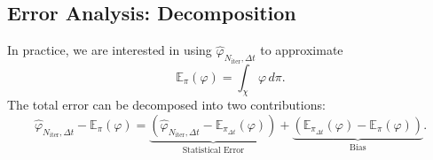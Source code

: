 \documentclass{article}
\newtheorem{theorem}{Theorem}[section]
\begin{document}

\subsection{Error Analysis: Decomposition}

In practice, we are interested in using $\widehat{\varphi}_{N_{\text{iter}},\Delta t}$ to approximate
\[
\mathbb{E}_\pi(\varphi) = \int_\chi \varphi \, d\pi.
\]
The total error can be decomposed into two contributions:
\begin{equation} \label{eq:statistic_bias}
    \widehat{\varphi}_{N_{\text{iter}},\Delta t} - \mathbb{E}_\pi(\varphi) = \underbrace{\left( \widehat{\varphi}_{N_{\text{iter}},\Delta t} - \mathbb{E}_{\pi_{\Delta t}}(\varphi) \right)}_{\text{Statistical Error}} + \underbrace{\left( \mathbb{E}_{\pi_{\Delta t}}(\varphi) - \mathbb{E}_\pi(\varphi) \right)}_{\text{Bias}}.
\end{equation}
\end{document}

